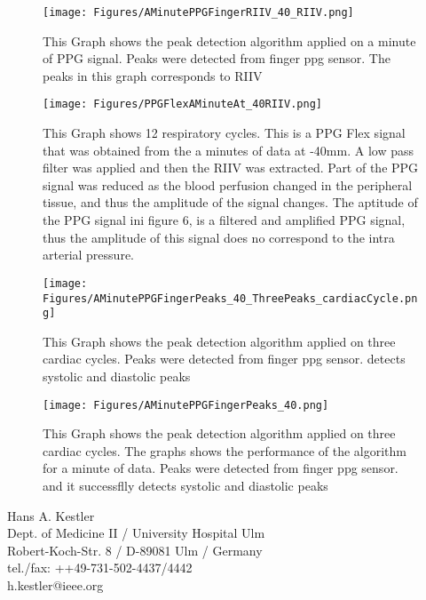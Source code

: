 \documentclass[twocolumn]{cinc}
\begin{document}
\begin{figure}[h!]
\centering
\texttt{[image: Figures/AMinutePPGFingerRIIV\_40\_RIIV.png]}
\caption{This Graph shows the peak detection algorithm applied on a minute of PPG signal. Peaks were detected from finger ppg sensor. The peaks in this graph corresponds to RIIV }
\label{fig:PIV}
\end{figure}




\begin{figure}[h!]
\centering
\texttt{[image: Figures/PPGFlexAMinuteAt\_40RIIV.png]}
\caption{This Graph shows 12 respiratory cycles. This is a PPG Flex signal that was obtained from the a minutes of data at -40mm. A low pass filter was applied and then the RIIV was extracted. Part of the PPG signal was reduced as the blood perfusion changed in the peripheral tissue, and thus the amplitude of the signal changes. The aptitude of the PPG signal ini figure 6, is a filtered and amplified PPG signal, thus the amplitude of this signal does no correspond to the intra arterial pressure.  }
\label{fig:PIV}
\end{figure}

\clearpage

\begin{figure}[h!]
\centering
\texttt{[image: Figures/AMinutePPGFingerPeaks\_40\_ThreePeaks\_cardiacCycle.png]}
\caption{This Graph shows the peak detection algorithm applied on three cardiac cycles. Peaks were detected from finger ppg sensor. detects systolic and diastolic peaks}
\label{fig:PIV}
\end{figure}




\begin{figure}[h!]
\centering
\texttt{[image: Figures/AMinutePPGFingerPeaks\_40.png]}
\caption{This Graph shows the peak detection algorithm applied on three cardiac cycles. The graphs shows the performance of the algorithm for a minute of data. Peaks were detected from finger ppg sensor. and it successflly detects systolic and diastolic peaks}
\label{fig:PIV}
\end{figure}



\vspace*{-2mm}


\begin{correspondence}
Hans A. Kestler\\
Dept. of Medicine II / University Hospital Ulm\\
Robert-Koch-Str. 8 / D-89081 Ulm / Germany\\
tel./fax: ++49-731-502-4437/4442\\
h.kestler@ieee.org
\end{correspondence}
\end{document}
